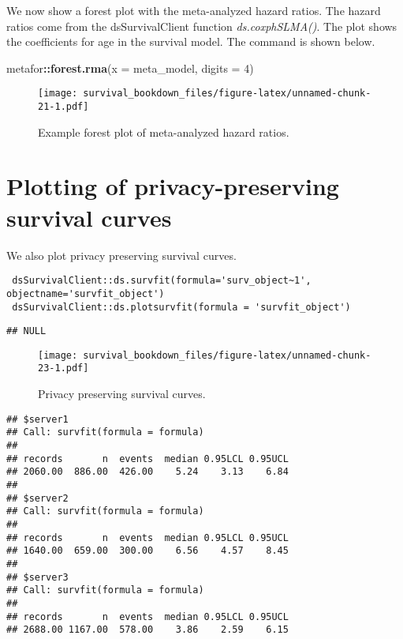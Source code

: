 \documentclass[
]{book}
\newenvironment{Shaded}{\begin{snugshade}}{\end{snugshade}}
\newcommand{\DataTypeTok}[1]{\textcolor[rgb]{0.13,0.29,0.53}{#1}}
\newcommand{\DecValTok}[1]{\textcolor[rgb]{0.00,0.00,0.81}{#1}}
\newcommand{\KeywordTok}[1]{\textcolor[rgb]{0.13,0.29,0.53}{\textbf{#1}}}
\newcommand{\NormalTok}[1]{#1}
\newcommand{\OperatorTok}[1]{\textcolor[rgb]{0.81,0.36,0.00}{\textbf{#1}}}
\begin{document}
We now show a forest plot with the meta-analyzed hazard ratios. The hazard ratios come
from the dsSurvivalClient function \emph{ds.coxphSLMA()}. The plot shows the coefficients for age in the survival model.
The command is shown below.

\begin{Shaded}
\begin{Highlighting}[]
\NormalTok{metafor}\OperatorTok{::}\KeywordTok{forest.rma}\NormalTok{(}\DataTypeTok{x =}\NormalTok{ meta_model, }\DataTypeTok{digits =} \DecValTok{4}\NormalTok{) }
\end{Highlighting}
\end{Shaded}

\begin{figure}
\centering
\texttt{[image: survival\_bookdown\_files/figure-latex/unnamed-chunk-21-1.pdf]}
\caption{\label{fig:unnamed-chunk-21}Example forest plot of meta-analyzed hazard ratios.}
\end{figure}

\hypertarget{plotting-of-privacy-preserving-survival-curves}{%
\section{Plotting of privacy-preserving survival curves}\label{plotting-of-privacy-preserving-survival-curves}}

We also plot privacy preserving survival curves.

\begin{verbatim}
 dsSurvivalClient::ds.survfit(formula='surv_object~1', objectname='survfit_object')
 dsSurvivalClient::ds.plotsurvfit(formula = 'survfit_object')
\end{verbatim}

\begin{verbatim}
## NULL
\end{verbatim}

\begin{figure}
\centering
\texttt{[image: survival\_bookdown\_files/figure-latex/unnamed-chunk-23-1.pdf]}
\caption{\label{fig:unnamed-chunk-23}Privacy preserving survival curves.}
\end{figure}

\begin{verbatim}
## $server1
## Call: survfit(formula = formula)
## 
## records       n  events  median 0.95LCL 0.95UCL 
## 2060.00  886.00  426.00    5.24    3.13    6.84 
## 
## $server2
## Call: survfit(formula = formula)
## 
## records       n  events  median 0.95LCL 0.95UCL 
## 1640.00  659.00  300.00    6.56    4.57    8.45 
## 
## $server3
## Call: survfit(formula = formula)
## 
## records       n  events  median 0.95LCL 0.95UCL 
## 2688.00 1167.00  578.00    3.86    2.59    6.15
\end{verbatim}
\end{document}
